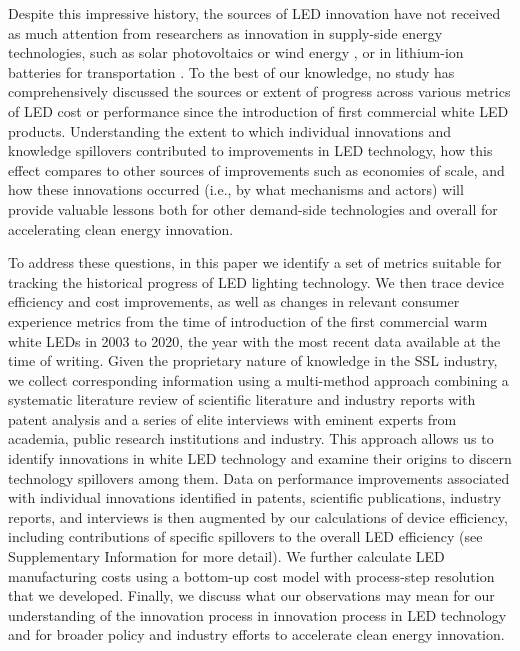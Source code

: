 \documentclass[twoside,twocolumn,9pt]{article}
\begin{document}
Despite this impressive history, the sources of LED innovation have not received as much attention from researchers as innovation in supply-side  energy technologies, such as solar photovoltaics  \cite{kavlak2018evaluating} or wind energy \cite{qiu2012price}\cite{jennings2020policy}, or in lithium-ion batteries for transportation \cite{Ziegler2021}\cite{Stephan2021}. To the best of our knowledge, no study has comprehensively discussed the sources or extent of progress across various metrics of LED cost or performance since the introduction of first commercial white LED products.  Understanding the extent to which individual innovations and knowledge spillovers  contributed to improvements in LED technology, how this effect compares to other sources of improvements such as economies of scale, and how these innovations occurred (i.e., by what mechanisms and actors) will provide valuable lessons both for other demand-side technologies and overall for accelerating clean energy innovation.

To address these questions, in this paper we identify a set of metrics suitable for tracking the historical progress of LED lighting technology. We then trace device efficiency and cost improvements, as well as changes in relevant consumer experience metrics from the time of introduction of the first commercial warm white LEDs in 2003 to 2020, the year with the most recent data available at the time of writing. Given the proprietary nature of knowledge in the SSL industry, we collect corresponding information using a multi-method approach combining a systematic literature review of scientific literature and industry reports with patent analysis and a series of elite interviews \cite{tansey2009process} with eminent experts from academia, public research institutions and industry. This approach allows us to identify innovations in white LED technology and examine their origins to discern technology spillovers among them. Data on performance improvements associated with individual innovations identified in patents, scientific publications, industry reports, and interviews is then augmented  by our calculations of device efficiency, including contributions of specific spillovers to the overall LED efficiency (see Supplementary Information for more detail). We further calculate LED manufacturing costs using a bottom-up cost model with process-step resolution that we developed. Finally, we discuss what our observations may mean for our understanding of the innovation process in innovation process in LED technology and for broader policy and industry efforts to accelerate clean energy innovation.
\end{document}
